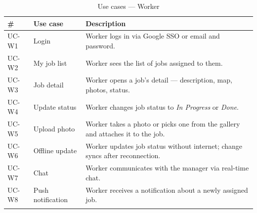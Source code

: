 \begin{longtable}{p{}p{}p{}}
  \toprule
  \textbf{\#} & \textbf{Use case} & \textbf{Description} \\
  \midrule
  \endhead
  UC-W1 & Login              & Worker logs in via Google SSO or email and password. \\
  UC-W2 & My job list        & Worker sees the list of jobs assigned to them. \\
  UC-W3 & Job detail         & Worker opens a job's detail --- description, map, photos, status. \\
  UC-W4 & Update status      & Worker changes job status to \textit{In Progress} or \textit{Done}. \\
  UC-W5 & Upload photo       & Worker takes a photo or picks one from the gallery and attaches it to the job. \\
  UC-W6 & Offline update     & Worker updates job status without internet; change syncs after reconnection. \\
  UC-W7 & Chat               & Worker communicates with the manager via real-time chat. \\
  UC-W8 & Push notification  & Worker receives a notification about a newly assigned job. \\
  \bottomrule
  \caption{Use cases --- Worker}
\end{longtable}